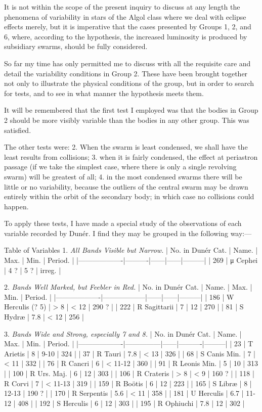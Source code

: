 \documentclass[a4paper, 12pt, oneside, polutonikogreek, english]{article}
\begin{document}
It is not within the scope of the present inquiry to discuss at any length the phenomena of variability in stars of the Algol class where we deal with eclipse effects merely, but it is imperative that the cases presented by Groups 1, 2, and 6, where, according to the hypothesis, the increased luminosity is produced by subsidiary swarms, should be fully considered.

So far my time has only permitted me to discuss with all the requisite care and detail the variability conditions in Group 2. These have been brought together not only to illustrate the physical conditions of the group, but in order to search for tests, and to see in what manner the hypothesis meets them.

It will be remembered that the first test I employed was that the bodies in Group 2 should be more visibly variable than the bodies in any other group. This was satisfied.

The other tests were: 2. When the swarm is least condensed, we shall have the least results from collisions; 3. when it is fairly condensed, the effect at periastron passage (if we take the simplest case, where there is only a single revolving swarm) will be greatest of all; 4. in the most condensed swarms there will be little or no variability, because the outliers of the central swarm may be drawn entirely within the orbit of the secondary body; in which case no collisions could happen.

To apply these tests, I have made a special study of the observations of each variable recorded by Dunér. I find they may be grouped in the following way:---

Table of Variables 
1. \emph{All Bands Visible but Narrow.} 
| No. in Dunér Cat. | Name.  | Max. | Min. | Period. |
|-------------------|----------|------|------|---------|
| 269        | μ Cephei | 4 ? | 5 ? | irreg. |

2. \emph{Bands Well Marked, but Feebler in Red.} 
| No. in Dunér Cat. | Name.      | Max. | Min. | Period. |
|-------------------|------------------|------|------|---------|
| 186        | W Herculis (? 5) | > 8 | < 12 | 290 ?  |
| 222        | R Sagittarii   | 7  | 12  | 270   |
| 81        | S Hydræ     | 7.8 | < 12 | 256   |

3. \emph{Bands Wide and Strong, especially 7 and 8.} 
| No. in Dunér Cat. | Name.     | Max. | Min.   | Period. |
|-------------------|---------------|------|----------|---------|
| 23        | T Arietis   | 8  | 9-10   | 324   |
| 37        | R Tauri    | 7.8 | < 13   | 326   |
| 68        | S Canis Min. | 7  | < 11   | 332   |
| 76        | R Cancri   | 6  | < 11-12 | 360   |
| 91        | R Leonis Min. | 5  | 10    | 313   |
| 100        | R Urs. Maj.  | 6  | 12    | 303   |
| 106        | R Crateris  | > 8 | < 9   | 160 ?  |
| 118        | R Corvi    | 7  | < 11-13 | 319   |
| 159        | R Boötis   | 6  | 12    | 223   |
| 165        | S Libræ    | 8  | 12-13  | 190 ?  |
| 170        | R Serpentis  | 5.6 | < 11   | 358   |
| 181        | U Herculis  | 6.7 | 11-12  | 408   |
| 192        | S Herculis  | 6  | 12    | 303   |
| 195        | R Ophiuchi  | 7.8 | 12    | 302   |
\end{document}
